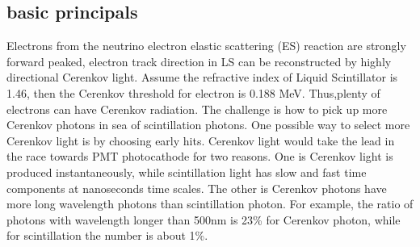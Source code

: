 \documentclass[a4paper,10pt]{cpc-hepnp}
\begin{document}
\subsection{basic principals}
Electrons from the neutrino electron elastic scattering (ES) reaction are
strongly forward peaked, electron track direction in LS can be reconstructed
by highly directional Cerenkov light. Assume the refractive index of Liquid Scintillator is 1.46, then the Cerenkov threshold for electron is 0.188 MeV. Thus,plenty of electrons
can have Cerenkov radiation. The challenge is how to pick up more Cerenkov
photons in sea of scintillation photons. One possible way to select more
Cerenkov light is by choosing early hits. Cerenkov light would take the lead in
the race towards PMT photocathode for two reasons. One is Cerenkov light is
produced instantaneously, while scintillation light has slow and fast time
components at nanoseconds time scales. The other is Cerenkov photons have more
long wavelength photons than scintillation photon. For example, the ratio of
photons with wavelength longer than 500nm is 23\% for Cerenkov photon, while
for scintillation the number is about 1\%.
\end{document}
